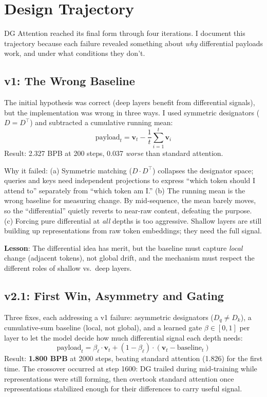 \documentclass[11pt]{article}
\begin{document}
\section{Design Trajectory}
\label{sec:trajectory}

DG Attention reached its final form through four iterations. I document this trajectory because each failure revealed something about \emph{why} differential payloads work, and under what conditions they don't.

\subsection{v1: The Wrong Baseline}
The initial hypothesis was correct (deep layers benefit from differential signals), but the implementation was wrong in three ways. I used symmetric designators ($D = D^\top$) and subtracted a cumulative running mean:
\begin{equation}
    \text{payload}_t = \mathbf{v}_t - \frac{1}{t}\sum_{i=1}^{t}\mathbf{v}_i
\end{equation}
Result: 2.327 BPB at 200 steps, 0.037 \emph{worse} than standard attention.

Why it failed: (a) Symmetric matching ($D \cdot D^\top$) collapses the designator space; queries and keys need independent projections to express ``which token should I attend to'' separately from ``which token am I.'' (b) The running mean is the wrong baseline for measuring change. By mid-sequence, the mean barely moves, so the ``differential'' quietly reverts to near-raw content, defeating the purpose. (c) Forcing pure differential at \emph{all} depths is too aggressive. Shallow layers are still building up representations from raw token embeddings; they need the full signal.

\textbf{Lesson}: The differential idea has merit, but the baseline must capture \emph{local} change (adjacent tokens), not global drift, and the mechanism must respect the different roles of shallow vs.\ deep layers.

\subsection{v2.1: First Win, Asymmetry and Gating}
Three fixes, each addressing a v1 failure: asymmetric designators ($D_q \neq D_k$), a cumulative-sum baseline (local, not global), and a learned gate $\beta \in [0, 1]$ per layer to let the model decide how much differential signal each depth needs:
\begin{equation}
    \text{payload}_t = \beta_\ell \cdot \mathbf{v}_t + (1 - \beta_\ell) \cdot (\mathbf{v}_t - \text{baseline}_t)
\end{equation}
Result: \textbf{1.800 BPB} at 2000 steps, beating standard attention (1.826) for the first time. The crossover occurred at step 1600: DG trailed during mid-training while representations were still forming, then overtook standard attention once representations stabilized enough for their differences to carry useful signal.
\end{document}
